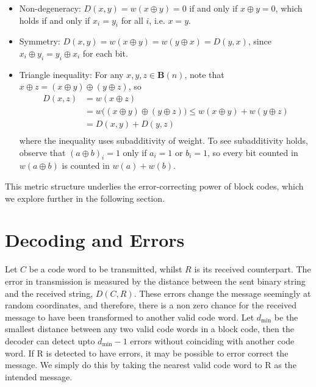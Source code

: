\documentclass{article}
\begin{document}
\begin{itemize}
    \item Non-degeneracy: \(D(x,y) = w(x \oplus y) = 0\) if and only if \(x \oplus y = 0\), which holds 
        if and only if \(x_i = y_i\) for all \(i\), i.e. \(x = y\).

    \item Symmetry: \(D(x,y) = w(x \oplus y) = w(y \oplus x) = D(y,x)\), since \(x_i \oplus y_i = y_i 
        \oplus x_i\) for each bit.

    \item Triangle inequality: For any \(x, y, z \in \mathbf{B}(n)\), note that \(x \oplus z = (x \oplus y)
        \oplus (y \oplus z)\), so
        \begin{align*}
            D(x,z) &= w(x\oplus z) \\
                   &= w\bigl((x\oplus y)\oplus(y\oplus z)\bigr) \leq w(x\oplus y) + w(y\oplus z) \\
                   &= D(x,y)+D(y,z) \\
        \end{align*}
        where the inequality uses subadditivity of weight. To see subadditivity holds, observe that
        \((a \oplus b)_i = 1\) only if \(a_i = 1\) or \(b_i = 1\), so every bit counted 
        in \(w(a\oplus b)\) is counted in \(w(a)+w(b)\).
\end{itemize}
This metric structure underlies the error-correcting power of block codes, which we explore further
in the following section.

\section{Decoding and Errors}
Let \(C\) be a code word to be transmitted, whilst \(R\) is its received counterpart. The error in
transmission is measured by the distance between the sent binary string and the received 
string, \(D(C, R)\). These errors change the message seemingly at random coordinates, and therefore,
there is a non zero chance for the received message to have been transformed to another valid code 
word. Let \(d_\text{min}\) be the smallest distance between any two valid code words in a block code,
then the decoder can detect upto \(d_\text{min} - 1\) errors without coinciding with another code word.
If R is detected to have errors, it may be possible to error correct the message. We simply do this by
taking the nearest valid code word to R as the intended message. 
\end{document}

